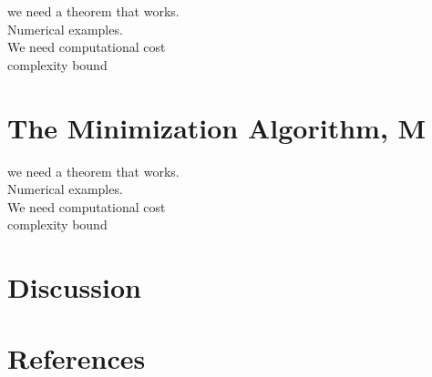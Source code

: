 \documentclass[review]{elsarticle}
\theoremstyle{definition}
\begin{document}
we need a theorem that works.\\

Numerical examples.\\
We need computational cost\\
complexity bound \\

\section{The Minimization Algorithm, M}

we need a theorem that works.\\
Numerical examples.\\
We need computational cost\\
complexity bound \\

\section{Discussion}

\section*{References}


\end{document}
